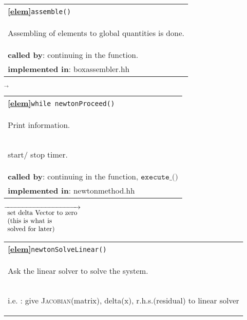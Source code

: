 \begin{landscape}
{\begin{tabular}{|l|}
      \hline 
      \textbf{\textcircled{\ref{elem}}}\verb?assemble()? \\ 
      \begin{scriptsize}Assembling of elements to global quantities is done.\end{scriptsize}\\
      \textbf{called by}: continuing in the function. \\ 
      \textbf{implemented in}: boxassembler.hh\\ 
	\hline 
  \end{tabular}
\nextline
    {$\overrightarrow{}
    $}
   \begin{tabular}{|l|} 
      \hline 
      \textbf{\textcircled{\ref{elem}}}\verb?while newtonProceed()  ?\\ 
      \begin{scriptsize}Print information.\end{scriptsize}\\
      \begin{scriptsize}start/ stop timer.\end{scriptsize}\\
      \textbf{called by}: continuing in the function, $\texttt{execute\_()}$ \\ 
      \textbf{implemented in}: newtonmethod.hh\\ 
	\hline 
  \end{tabular}
    {\scriptsize$\overrightarrow
				  {\begin{array}{l}
				  \textnormal{set delta Vector to zero} \\
				  \textnormal{(this is what is}\\
				  \textnormal{solved for later)}\\
                                \end{array}}
    $}
   \begin{tabular}{|l|} 
      \hline 
      \textbf{\textcircled{\ref{elem}}}\verb?newtonSolveLinear()  ?\\ 
      \begin{scriptsize}Ask the linear solver to solve the system.\end{scriptsize}\\
      \begin{scriptsize}i.e. : give \textsc{Jacobian}(matrix), delta(x), r.h.s.(residual) to linear solver\end{scriptsize}\\

\end{tabular}}
\end{landscape}
